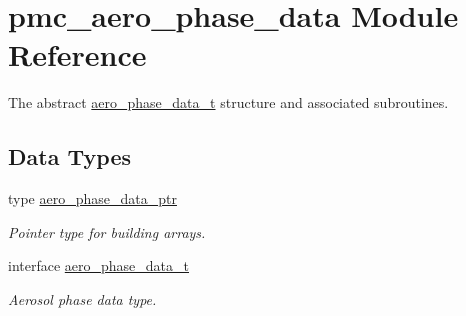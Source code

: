 \hypertarget{namespacepmc__aero__phase__data}{}\section{pmc\+\_\+aero\+\_\+phase\+\_\+data Module Reference}
\label{namespacepmc__aero__phase__data}


The abstract \mbox{\hyperlink{structpmc__aero__phase__data_1_1aero__phase__data__t}{aero\+\_\+phase\+\_\+data\+\_\+t}} structure and associated subroutines.  


\subsection*{Data Types}
\begin{DoxyCompactItemize}
\item 
type \mbox{\hyperlink{structpmc__aero__phase__data_1_1aero__phase__data__ptr}{aero\+\_\+phase\+\_\+data\+\_\+ptr}}
\begin{DoxyCompactList}\small\item\em Pointer type for building arrays. \end{DoxyCompactList}\item 
interface \mbox{\hyperlink{structpmc__aero__phase__data_1_1aero__phase__data__t}{aero\+\_\+phase\+\_\+data\+\_\+t}}
\begin{DoxyCompactList}\small\item\em Aerosol phase data type. \end{DoxyCompactList}\end{DoxyCompactItemize}
